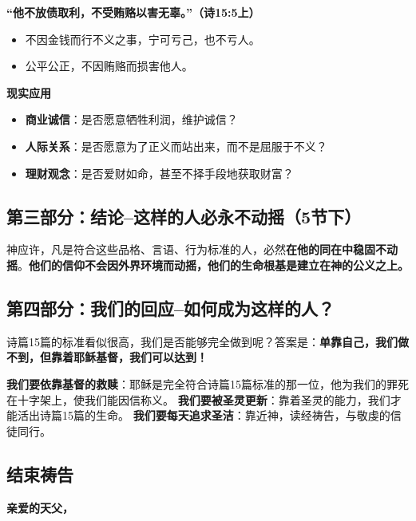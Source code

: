 \documentclass[a4paper, 12pt]{article}
\begin{document}
\textbf{“他不放债取利，不受贿赂以害无辜。”（诗15:5上）}

\begin{itemize}
    \item 不因金钱而行不义之事，宁可亏己，也不亏人。  

    \item 公平公正，不因贿赂而损害他人。  

\end{itemize}

\textbf{现实应用}  
\begin{itemize}
    \item \textbf{商业诚信}：是否愿意牺牲利润，维护诚信？  

    \item \textbf{人际关系}：是否愿意为了正义而站出来，而不是屈服于不义？  

    \item \textbf{理财观念}：是否爱财如命，甚至不择手段地获取财富？  

\end{itemize}



\subsection*{第三部分：结论--这样的人必永不动摇（5节下）} 

神应许，凡是符合这些品格、言语、行为标准的人，必然\textbf{在他的同在中稳固不动摇}。\textbf{他们的信仰不会因外界环境而动摇，他们的生命根基是建立在神的公义之上。} 

\subsection*{第四部分：我们的回应--如何成为这样的人？ }
 
\hspace{0.6cm}诗篇15篇的标准看似很高，我们是否能够完全做到呢？答案是：\textbf{单靠自己，我们做不到，但靠着耶稣基督，我们可以达到！  }

\textbf{我们要依靠基督的救赎}：耶稣是完全符合诗篇15篇标准的那一位，他为我们的罪死在十字架上，使我们能因信称义。  
\textbf{我们要被圣灵更新}：靠着圣灵的能力，我们才能活出诗篇15篇的生命。  
\textbf{我们要每天追求圣洁}：靠近神，读经祷告，与敬虔的信徒同行。  


\subsection*{结束祷告}
\textbf{亲爱的天父，}
\end{document}
